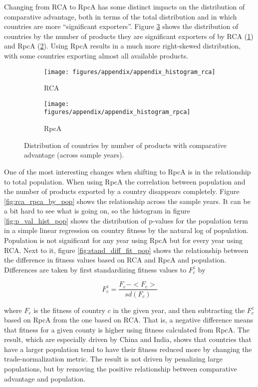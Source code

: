 \documentclass[11pt]{article}
\begin{document}
\begin{appendices}
Changing from RCA to RpcA has some distinct impacts on the distribution of comparative advantage, both in terms of the total distribution and in which countries are more ``significant exporters''. Figure \ref{fig:rca_rpca_hist} shows the distribution of countries by the number of products they are significant exporters of by RCA (\ref{fig:rca_hist}) and RpcA (\ref{fig:rpca_hist}). Using RpcA results in a much more right-skewed distribution, with some countries exporting almost all available products.

\begin{figure}
     \centering
     \begin{subfigure}[b]{0.45\textwidth}
         \centering
         \texttt{[image: figures/appendix/appendix\_histogram\_rca]}
         \caption{RCA}
         \label{fig:rca_hist}
     \end{subfigure}
     \hfill
     \begin{subfigure}[b]{0.45\textwidth}
         \centering
         \texttt{[image: figures/appendix/appendix\_histogram\_rpca]}
         \caption{RpcA}
         \label{fig:rpca_hist}
     \end{subfigure}
        \caption{Distribution of countries by number of products with
		  comparative advantage (across sample years).}
        \label{fig:rca_rpca_hist}
\end{figure}

One of the most interesting changes when shifting to RpcA is in the relationship to total population. When using RpcA the correlation between population and the number of products exported by a country disappears completely. Figure \ref{fig:rca_rpca_by_pop} shows the relationship across the sample years. It can be a bit hard to see what is going on, so the histogram in figure \ref{fig:p_val_hist_pop} shows the distribution of p-values for the population term in a simple linear regression on country fitness by the natural log of population. Population is not significant for any year using RpcA but for every year using RCA. Next to it, figure \ref{fig:stand_diff_fit_pop} shows the relationship between the difference in fitness values based on RCA and RpcA and population. Differences are taken by first standardizing fitness values to \(F^{z}_{c}\) by

\[
 F^{z}_{c} = \frac{F_{c} - <F_{c}>}{sd(F_{c})}
\]

where \(F_{c}\) is the fitness of country \(c\) in the given year, and then subtracting the \(F^{z}_{c}\) based on RpcA from the one based on RCA. That is, a negative difference means that fitness for a given county is higher using fitness calculated from RpcA. The result, which are especially driven by China and India, shows that countries that have a larger population tend to have their fitness reduced more by changing the trade-normalization metric. The result is not driven by penalizing large populations, but by removing the positive relationship between comparative advantage and population.


\end{appendices}
\end{document}
